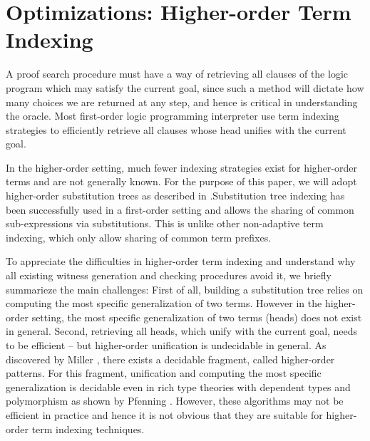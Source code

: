 \documentclass{acmconf}
\begin{document}
\section{Optimizations: Higher-order Term Indexing}

A proof search procedure must have a way of retrieving all clauses of
the logic program which may satisfy the current goal, since such a
method will dictate how many choices we are returned at any step, and
hence is critical in understanding the oracle. Most first-order logic
programming interpreter use term indexing strategies to efficiently
retrieve all clauses whose head unifies with the current goal.

In the higher-order setting, much fewer indexing strategies exist for
higher-order terms and are not generally known. For the purpose of
this paper, we will adopt higher-order substitution trees as described
in \cite{Pientka:ICLP03}.Substitution tree indexing has been
successfully used in a first-order setting \cite{graf:substtrees} and
allows the sharing of common sub-expressions via substitutions. This
is unlike other non-adaptive term indexing, which only allow sharing
of common term prefixes. 

To appreciate the difficulties in higher-order term indexing and
understand why all existing witness generation and checking procedures
avoid it, we briefly summarieze the main challenges:
 First of all, building a substitution tree relies on computing the
 most specific generalization of two terms. However in the
 higher-order setting, the most specific generalization of two terms (heads)
 does not exist in general. Second, retrieving all heads, which unify
 with the current goal, needs to be efficient --
but higher-order unification is undecidable in general.  As discovered
by Miller \cite{Miller91iclp}, there exists a decidable fragment,
called higher-order patterns. For this fragment, unification and
computing the most specific generalization is decidable even in 
rich type theories with dependent types and polymorphism as shown by
Pfenning \cite{Pfenning91lics}.  However, these algorithms may not be
efficient in practice  \cite{PientkaPfenning:CADE03} and hence it is
not obvious that they are suitable for higher-order term
indexing techniques. 
\end{document}
